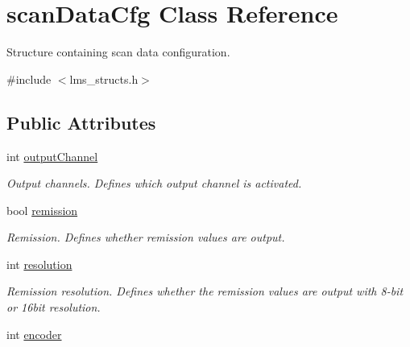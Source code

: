 \hypertarget{structscanDataCfg}{}\section{scan\+Data\+Cfg Class Reference}
\label{structscanDataCfg}


Structure containing scan data configuration.  




{\ttfamily \#include $<$lms\+\_\+structs.\+h$>$}

\subsection*{Public Attributes}
\begin{DoxyCompactItemize}
\item 
\mbox{\label{structscanDataCfg_a1bd093970b634207cd5468eef1424c11}} 
int \hyperlink{structscanDataCfg_a1bd093970b634207cd5468eef1424c11}{output\+Channel}
\begin{DoxyCompactList}\small\item\em Output channels. Defines which output channel is activated. \end{DoxyCompactList}\item 
\mbox{\label{structscanDataCfg_a7af16dea7cd8f098a903cc7385fa08de}} 
bool \hyperlink{structscanDataCfg_a7af16dea7cd8f098a903cc7385fa08de}{remission}
\begin{DoxyCompactList}\small\item\em Remission. Defines whether remission values are output. \end{DoxyCompactList}\item 
\mbox{\label{structscanDataCfg_ae612806c05aa54c20844efaebc488b57}} 
int \hyperlink{structscanDataCfg_ae612806c05aa54c20844efaebc488b57}{resolution}
\begin{DoxyCompactList}\small\item\em Remission resolution. Defines whether the remission values are output with 8-\/bit or 16bit resolution. \end{DoxyCompactList}\item 
\mbox{\label{structscanDataCfg_a220d024126ceecf54ebd3a816dbcc22c}} 
int \hyperlink{structscanDataCfg_a220d024126ceecf54ebd3a816dbcc22c}{encoder}

\end{DoxyCompactItemize}
